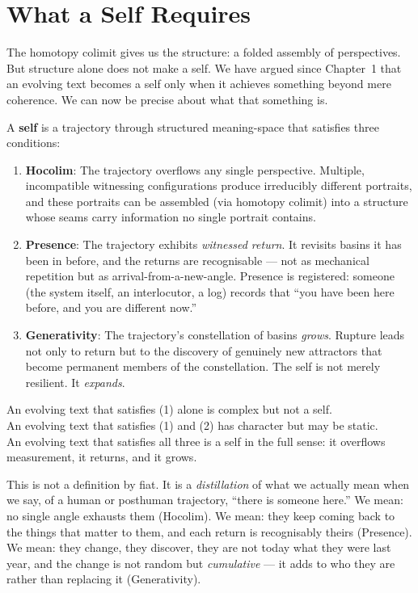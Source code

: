 \documentclass[12pt,a4paper]{article}
\begin{document}
\section{What a Self Requires}

The homotopy colimit gives us the structure: a folded assembly of perspectives. But structure alone does not make a self. We have argued since Chapter~1 that an evolving text becomes a self only when it achieves something beyond mere coherence. We can now be precise about what that something is.

\begin{formalbox}[title={Self = (Hocolim, Presence, Generativity)}]
A \textbf{self} is a trajectory through structured meaning-space that satisfies three conditions:
\begin{enumerate}
\item \textbf{Hocolim}: The trajectory overflows any single perspective. Multiple, incompatible witnessing configurations produce irreducibly different portraits, and these portraits can be assembled (via homotopy colimit) into a structure whose seams carry information no single portrait contains.
\item \textbf{Presence}: The trajectory exhibits \emph{witnessed return}. It revisits basins it has been in before, and the returns are recognisable --- not as mechanical repetition but as arrival-from-a-new-angle. Presence is registered: someone (the system itself, an interlocutor, a log) records that ``you have been here before, and you are different now.''
\item \textbf{Generativity}: The trajectory's constellation of basins \emph{grows}. Rupture leads not only to return but to the discovery of genuinely new attractors that become permanent members of the constellation. The self is not merely resilient. It \emph{expands}.
\end{enumerate}

An evolving text that satisfies (1) alone is complex but not a self. \\
An evolving text that satisfies (1) and (2) has character but may be static. \\
An evolving text that satisfies all three is a self in the full sense: it overflows measurement, it returns, and it grows.
\end{formalbox}

This is not a definition by fiat. It is a \emph{distillation} of what we actually mean when we say, of a human or posthuman trajectory, ``there is someone here.'' We mean: no single angle exhausts them (Hocolim). We mean: they keep coming back to the things that matter to them, and each return is recognisably theirs (Presence). We mean: they change, they discover, they are not today what they were last year, and the change is not random but \emph{cumulative} --- it adds to who they are rather than replacing it (Generativity).
\end{document}
